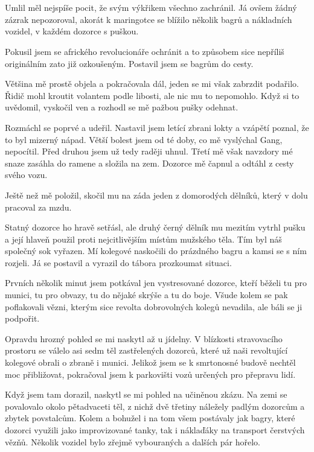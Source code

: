 \chapter{}

Umlil měl nejspíše pocit, že svým výkřikem všechno zachránil. Já ovšem žádný zázrak nepozoroval, akorát k maringotce se blížilo několik bagrů a nákladních vozidel, v každém dozorce s puškou.

Pokusil jsem se afrického revolucionáře ochránit a to způsobem sice nepříliš originálním zato již ozkoušeným. Postavil jsem se bagrům do cesty.

Většina mě prostě objela a pokračovala dál, jeden se mi však zabrzdit podařilo. Řidič mohl kroutit volantem podle libosti, ale nic mu to nepomohlo. Když si to uvědomil, vyskočil ven a rozhodl se mě pažbou pušky odehnat. 

Rozmáchl se poprvé a udeřil. Nastavil jsem letící zbrani lokty a vzápětí poznal, že to byl mizerný nápad. Větší bolest jsem od té doby, co mě vyslýchal Gang, nepocítil. Před druhou jsem už tedy raději uhnul. Třetí mě však navzdory mé snaze zasáhla do ramene a složila na zem. Dozorce mě čapnul a odtáhl z cesty svého vozu. 

Ještě než mě položil, skočil mu na záda jeden z domorodých dělníků, který v dolu pracoval za mzdu.

Statný dozorce ho hravě setřásl, ale druhý černý dělník mu mezitím vytrhl pušku a její hlaveň použil proti nejcitlivějším místům mužského těla. Tím byl náš společný sok vyřazen.
Mí kolegové naskočili do prázdného bagru a kamsi se s ním rozjeli. Já se postavil a vyrazil do tábora prozkoumat situaci.

Prvních několik minut jsem potkával jen vystresované dozorce, kteří běželi tu pro munici, tu pro obvazy, tu do nějaké skrýše a tu do boje. Všude kolem se pak poflakovali vězni, kterým sice revolta dobrovolných kolegů nevadila, ale báli se ji podpořit. 

Opravdu hrozný pohled se mi naskytl až u jídelny. V blízkosti stravovacího prostoru se válelo asi sedm těl zastřelených dozorců, které už naši revoltující kolegové obrali o zbraně i munici. Jelikož jsem se k smrtonosné budově nechtěl moc přibližovat, pokračoval jsem k parkovišti vozů určených pro přepravu lidí.   

Když jsem tam dorazil, naskytl se mi pohled na učiněnou zkázu. Na zemi se povalovalo okolo pětadvaceti těl, z nichž dvě třetiny náležely padlým dozorcům a zbytek povstalcům. Kolem a bohužel i na tom všem postávaly jak bagry, které dozorci využili jako improvizované tanky, tak i náklaďáky na transport čerstvých vězňů. Několik vozidel bylo zřejmě vybouraných a dalších pár hořelo.

